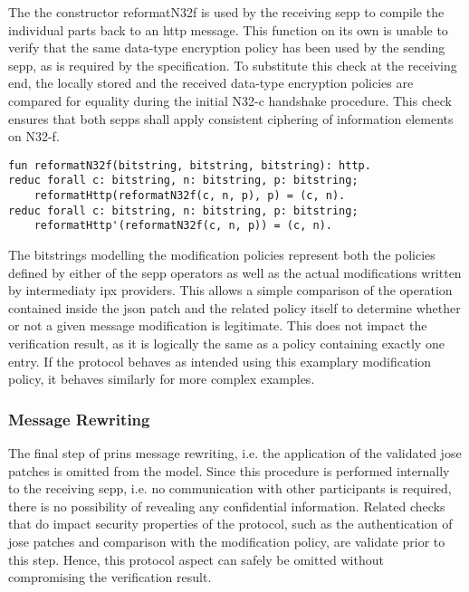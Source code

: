 The the constructor {\sffamily reformatN32f} is used by the receiving \gls{sepp} to compile the individual parts back to an \gls{http} message.
This function on its own is unable to verify that the same data-type encryption policy has been used by the sending \gls{sepp}, as is required by the specification.
To substitute this check at the receiving end, the locally stored and the received data-type encryption policies are compared for equality during the initial N32-c handshake procedure.
This check ensures that both \glspl{sepp} shall apply consistent ciphering of information elements on N32-f.

\begin{lstlisting}[caption={N32-f message rewriting},label={lst:n32f-rewriting},firstnumber=105]
fun reformatN32f(bitstring, bitstring, bitstring): http.
reduc forall c: bitstring, n: bitstring, p: bitstring;
    reformatHttp(reformatN32f(c, n, p), p) = (c, n).
reduc forall c: bitstring, n: bitstring, p: bitstring;
    reformatHttp'(reformatN32f(c, n, p)) = (c, n).
\end{lstlisting}

The bitstrings modelling the modification policies represent both the policies defined by either of the \gls{sepp} operators as well as the actual modifications written by intermediaty \gls{ipx} providers.
This allows a simple comparison of the operation contained inside the \gls{json} patch and the related policy itself to determine whether or not a given message modification is legitimate.
This does not impact the verification result, as it is logically the same as a policy containing exactly one entry.
If the protocol behaves as intended using this examplary modification policy, it behaves similarly for more complex examples.

\subsubsection{Message Rewriting}

The final step of \gls{prins} message rewriting, i.e. the application of the validated \gls{jose} patches is omitted from the model.
Since this procedure is performed internally to the receiving \gls{sepp}, i.e. no communication with other participants is required, there is no possibility of revealing any confidential information.
Related checks that do impact security properties of the protocol, such as the authentication of \gls{jose} patches and comparison with the modification policy, are validate prior to this step.
Hence, this protocol aspect can safely be omitted without compromising the verification result.


